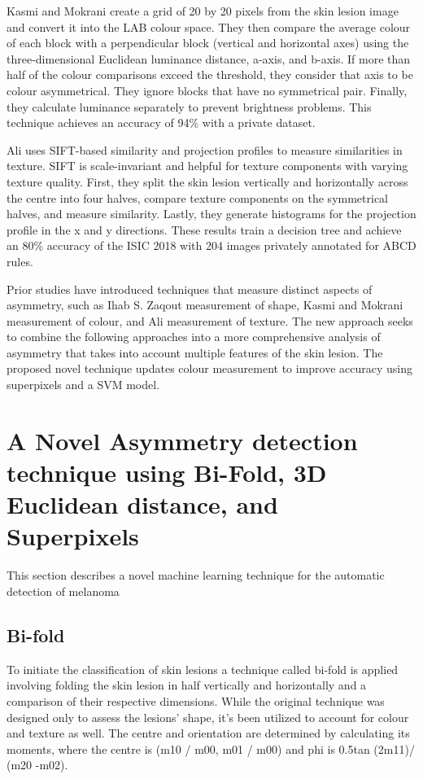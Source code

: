 Kasmi and Mokrani\cite{Kasmi2016} create a grid of 20 by 20 pixels from the skin lesion image and convert it into the LAB colour space. They then compare the average colour of each block with a perpendicular block (vertical and horizontal axes) using the three-dimensional Euclidean luminance distance, a-axis, and b-axis. If more than half of the colour comparisons exceed the threshold, they consider that axis to be colour asymmetrical. They ignore blocks that have no symmetrical pair. Finally, they calculate luminance separately to prevent brightness problems. This technique achieves an accuracy of 94\% with a private dataset.

Ali\cite{Ali2020a} uses SIFT-based similarity and projection profiles to measure similarities in texture. SIFT is scale-invariant and helpful for texture components with varying texture quality. First, they split the skin lesion vertically and horizontally across the centre into four halves, compare texture components on the symmetrical halves, and measure similarity. Lastly, they generate histograms for the projection profile in the x and y directions. These results train a decision tree and achieve an 80\% accuracy of the ISIC 2018 with 204 images privately annotated for ABCD rules.

Prior studies have introduced techniques that measure distinct aspects of asymmetry, such as Ihab S. Zaqout\cite{Zaqout2016} measurement of shape, Kasmi and Mokrani\cite{Kasmi2016} measurement of colour, and  Ali\cite{Ali2020a} measurement of texture. The new approach seeks to combine the following approaches into a more comprehensive analysis of asymmetry that takes into account multiple features of the skin lesion. The proposed novel technique updates colour measurement to improve accuracy using superpixels and a SVM model.

\section{A Novel Asymmetry detection technique using Bi-Fold, 3D Euclidean distance, and Superpixels}
This section describes a novel machine learning technique for the automatic detection of melanoma

\subsection{Bi-fold}
To initiate the classification of skin lesions a technique called bi-fold is applied involving folding the skin lesion in half vertically and horizontally and a comparison of their respective dimensions. While the original technique was designed only to assess the lesions' shape, it's been utilized to account for colour and texture as well. The centre and orientation are determined by calculating its moments, where the centre is (m10 / m00, m01 / m00) and phi is 0.5tan (2m11)/ (m20 -m02).

